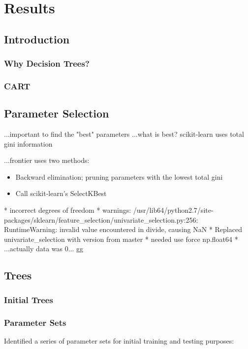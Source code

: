 \chapter{Results}
\section{Introduction}
\subsection{Why Decision Trees?}
\subsection{CART}

\section{Parameter Selection}
...important to find the "best" parameters
...what is best? scikit-learn uses total gini information

...frontier uses two methods:
\begin{itemize}
    \item Backward elimination; pruning parameters with the lowest total gini
    \item Call scikit-learn's SelectKBest
\end{itemize}


* incorrect degrees of freedom
* warnings: /usr/lib64/python2.7/site-packages/sklearn/feature\_selection/univariate\_selection.py:256: RuntimeWarning: invalid value encountered in divide, causing NaN
* Replaced univariate\_selection with version from master
* needed use force np.float64
* ...actually data was 0... gg


\section{Trees}
\subsection{Initial Trees}
\subsection{Parameter Sets}

Identified a series of parameter sets for initial training and testing purposes:

